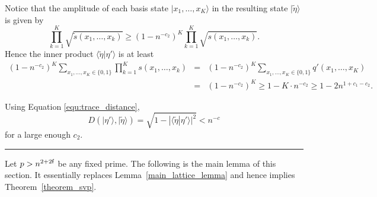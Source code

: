 \documentclass[11pt]{article}
\newcommand{\qedsymb}{\hfill{\rule{2mm}{2mm}}}
\newenvironment{proof}{\begin{trivlist}
\item[\hspace{\labelsep}{\sl\noindent Proof:\/}]
}{\qedsymb\end{trivlist}}
\newcommand\ket[1]{{ |{#1} \rangle }}
\begin{document}
\begin{proof}
Notice that the amplitude of each basis state $\ket{x_1,\ldots,x_K}$ in the resulting state $\ket{\tilde{\eta}}$ is
given by
$$ \prod_{k=1}^K \sqrt{\tilde{s}(x_1,\ldots,x_k)} \ge (1-n^{-c_2})^K \prod_{k=1}^K \sqrt{s(x_1,\ldots,x_k)}.$$
Hence the inner product $\langle \tilde{\eta} | \eta' \rangle$ is at least
 \begin{eqnarray*}
   (1-n^{-c_2})^K \sum_{x_1,\ldots,x_K \in \{0,1\}} \prod_{k=1}^K s(x_1,\ldots,x_k) &=&
   (1-n^{-c_2})^K \sum_{x_1,\ldots,x_K \in \{0,1\}} q'(x_1,\ldots,x_K) \\
   &=&  (1-n^{-c_2})^K \ge 1-K\cdot n^{-c_2} \ge 1-2 n^{1+c_1-c_2}.
 \end{eqnarray*}

Using Equation \ref{equ:trace_distance},
$$D(\ket{\eta'},\ket{\tilde{\eta}}) = \sqrt{1-|\langle \tilde{\eta} | \eta' \rangle|^2} < n^{-c}$$
for a large enough $c_2$.
\end{proof}

Let $p > n^{2+2{\sf f}}$ be any fixed prime. The following is the main lemma of this section. It essentially replaces
Lemma~\ref{main_lattice_lemma} and hence implies Theorem~\ref{theorem_svp}.
\end{document}
